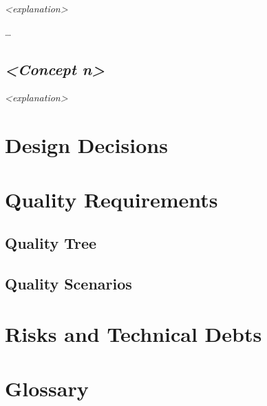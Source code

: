 \documentclass[]{article}
\begin{document}
\emph{\textless{}explanation\textgreater{}}

\ldots{}

\subsection{\texorpdfstring{\emph{\textless{}Concept
n\textgreater{}}}{\textless{}Concept n\textgreater{}}}\label{__emphasis_concept_n_emphasis}

\emph{\textless{}explanation\textgreater{}}

\section{Design Decisions}\label{section-design-decisions}

\section{Quality Requirements}\label{section-quality-scenarios}

\subsection{Quality Tree}\label{_quality_tree}

\subsection{Quality Scenarios}\label{_quality_scenarios}

\section{Risks and Technical Debts}\label{section-technical-risks}

\section{Glossary}\label{section-glossary}
\end{document}
